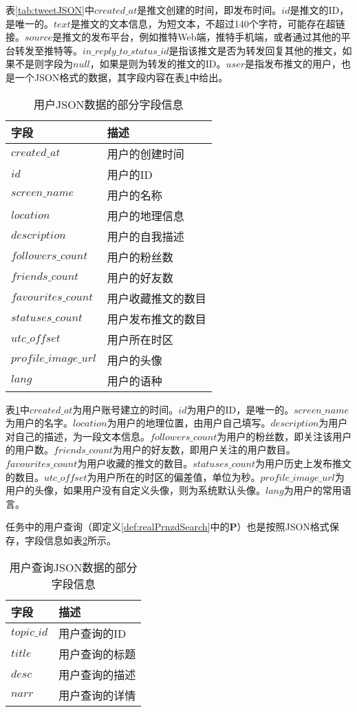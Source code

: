 表\ref{tab:tweetJSON}中$created\_at$是推文创建的时间，即发布时间。$id$是推文的ID，是唯一的。$text$是推文的文本信息，为短文本，不超过140个字符，可能存在超链接。$source$是推文的发布平台，例如推特Web端，推特手机端，或者通过其他的平台转发至推特等。$in\_reply\_to\_status\_id$是指该推文是否为转发回复其他的推文，如果不是则字段为$null$，如果是则为转发的推文的ID。$user$是指发布推文的用户，也是一个JSON格式的数据，其字段内容在表\ref{tab:userJSON}中给出。
\begin{table}[!htbp]
\centering
\caption{用户JSON数据的部分字段信息}
\begin{tabular}{|p{4cm}|p{7cm}|}
\hline
\textbf{字段} & \textbf{描述} \\
\hline
$created\_at$ & 用户的创建时间\\
\hline
$id$ & 用户的ID\\
\hline
$screen\_name$ & 用户的名称\\
\hline
$location$ & 用户的地理信息\\
\hline
$description$ & 用户的自我描述\\
\hline
$followers\_count$ & 用户的粉丝数\\
\hline
$friends\_count$ & 用户的好友数\\
\hline
$favourites\_count$ & 用户收藏推文的数目\\
\hline
$statuses\_count$ & 用户发布推文的数目\\
\hline
$utc\_offset$ & 用户所在时区\\
\hline
$profile\_image\_url$ & 用户的头像\\
\hline
$lang$ & 用户的语种\\
\hline
\end{tabular}
\label{tab:userJSON}
\end{table}

表\ref{tab:userJSON}中$created\_at$为用户账号建立的时间。$id$为用户的ID，是唯一的。$screen\_name$为用户的名字。$location$为用户的地理位置，由用户自己填写。$description$为用户对自己的描述，为一段文本信息。$followers\_count$为用户的粉丝数，即关注该用户的用户数。$friends\_count$为用户的好友数，即用户关注的用户数目。$favourites\_count$为用户收藏的推文的数目。$statuses\_count$为用户历史上发布推文的数目。$utc\_offset$为用户所在的时区的偏差值，单位为秒。$profile\_image\_url$为用户的头像，如果用户没有自定义头像，则为系统默认头像。$lang$为用户的常用语言。

任务中的用户查询（即定义\ref{def:realPrnzdSearch}中的\textbf{P}）也是按照JSON格式保存，字段信息如表\ref{tab:queryJSON}所示。
\begin{table}[!htbp]
\centering
\caption{用户查询JSON数据的部分字段信息}
\begin{tabular}{|p{4cm}|p{7cm}|}
\hline
\textbf{字段} & \textbf{描述} \\
\hline
$topic\_id$ & 用户查询的ID\\
\hline
$title$ & 用户查询的标题\\
\hline
$desc$ & 用户查询的描述\\
\hline
$narr$ & 用户查询的详情\\
\hline
\end{tabular}
\label{tab:queryJSON}
\end{table}

